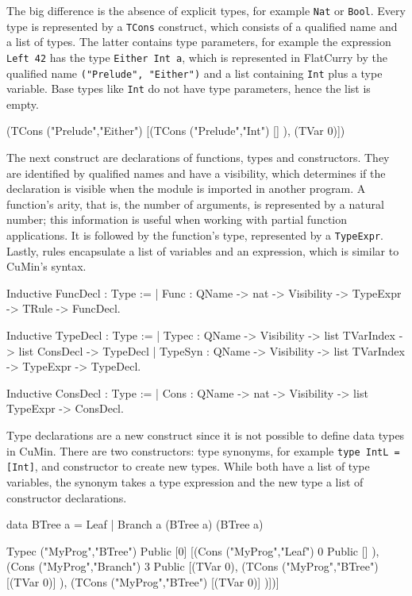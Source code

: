 \documentclass[fleqn]{scrreprt}
\newcommand{\coqinline}[1]{\texttt{#1}}
\begin{document}
The big difference is the absence of explicit types, for example \texttt{Nat} or \texttt{Bool}.  Every type is represented by a \coqinline{TCons} construct, which consists of a qualified name and a list of types. The latter contains type parameters, for example the expression \texttt{Left 42} has the type \texttt{Either Int a}, which is represented in FlatCurry by the qualified name \texttt{("Prelude", "Either")} and a list containing \texttt{Int} plus a type variable. Base types like \texttt{Int} do not have type parameters, hence the list is empty.
\begin{coqcode}
(TCons ("Prelude","Either") [(TCons ("Prelude","Int") [] ), (TVar 0)])
\end{coqcode}
The next construct are declarations of functions, types and constructors. They are identified by qualified names and have a visibility, which determines if the declaration is visible when the module is imported in another program. A function's arity, that is, the number of arguments, is represented by a natural number; this information is useful when working with partial function applications. It is followed by the function's type, represented by a \coqinline{TypeExpr}. Lastly, rules encapsulate a list of variables and an expression, which is similar to CuMin's syntax.
\begin{coqcode}
Inductive FuncDecl : Type := 
  | Func : QName -> nat -> Visibility -> TypeExpr -> TRule -> FuncDecl.

Inductive TypeDecl : Type :=
  | Typec   : QName -> Visibility -> list TVarIndex -> list ConsDecl -> TypeDecl
  | TypeSyn : QName -> Visibility -> list TVarIndex -> TypeExpr      -> TypeDecl.
  
Inductive ConsDecl : Type :=
  | Cons :  QName -> nat -> Visibility -> list TypeExpr -> ConsDecl.
\end{coqcode}
Type declarations are a new construct since it is not possible to define data types in CuMin. There are two constructors: type synonyms, for example \texttt{type IntL = [Int]}, and constructor to create new types. While both have a list of type variables, the synonym takes a type expression and the new type a list of constructor declarations.
\begin{coqcode}
data BTree a = Leaf | Branch a (BTree a) (BTree a)

Typec ("MyProg","BTree") Public  [0]  
[(Cons ("MyProg","Leaf") 0 Public  [] ), (Cons ("MyProg","Branch") 3 Public
                                           [(TVar 0), 
                                            (TCons ("MyProg","BTree") [(TVar 0)] ), 
                                            (TCons ("MyProg","BTree") [(TVar 0)] )])]
\end{coqcode}
\end{document}
